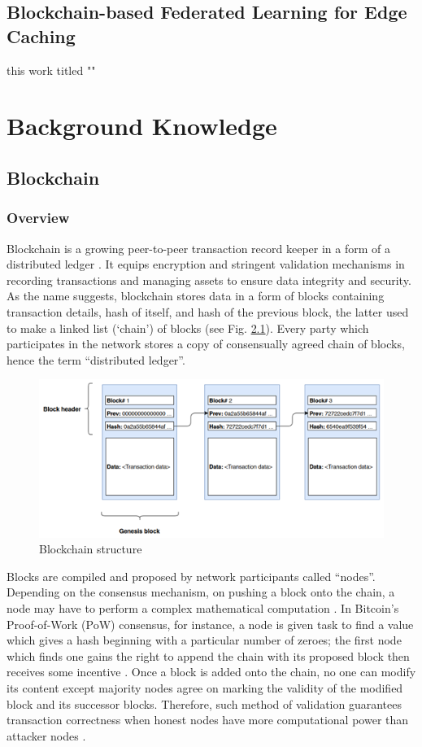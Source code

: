 \documentclass[a4paper,12pt,oneside, utf8x]{report}
\begin{document}
\section{Blockchain-based Federated Learning for Edge Caching \cite{0a65}}
this work titled ""


\chapter{Background Knowledge}
\label{cbknowledge}

\section{Blockchain}
\subsection{Overview}
Blockchain is a growing peer-to-peer transaction record keeper in a form of a distributed ledger \cite{a7}. It equips encryption and stringent validation mechanisms in recording transactions and managing assets to ensure data integrity and security. As the name suggests, blockchain stores data in a form of blocks containing transaction details, hash of itself, and hash of the previous block, the latter used to make a linked list (‘chain’) of blocks (see Fig. \ref{f31}). Every party which participates in the network stores a copy of consensually agreed chain of blocks, hence the term “distributed ledger”.

    \begin{figure}[H]
        \centering
        \includegraphics[width=.7\textwidth]{figures/3-1.png}
        \caption{Blockchain structure}
        \label{f31}
    \end{figure}
    
Blocks are compiled and proposed by network participants called “nodes”. Depending on the consensus mechanism, on pushing a block onto the chain, a node may have to perform a complex mathematical computation \cite{a7}. In Bitcoin’s Proof-of-Work (PoW) consensus, for instance, a node is given task to find a value which gives a hash beginning with a particular number of zeroes; the first node which finds one gains the right to append the chain with its proposed block then receives some incentive \cite{a20}. Once a block is added onto the chain, no one can modify its content except majority nodes agree on marking the validity of the modified block and its successor blocks. Therefore, such method of validation guarantees transaction correctness when honest nodes have more computational power than attacker nodes \cite{a7}. 
\end{document}
